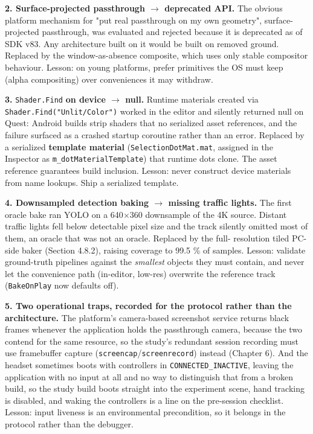 \textbf{2. Surface-projected passthrough $\rightarrow$ deprecated API.} The obvious platform mechanism for "put real
passthrough on my own geometry", surface-projected passthrough, was evaluated and rejected because
it is deprecated as of SDK v83. Any architecture built on it would be built on removed ground.
Replaced by the window-as-absence composite, which uses only stable compositor behaviour. Lesson: on
young platforms, prefer primitives the OS must keep (alpha compositing) over conveniences it may
withdraw.

\textbf{3. }\verb|Shader.Find|\textbf{ on device $\rightarrow$ null.} Runtime materials created via \verb|Shader.Find("Unlit/Color")|
worked in the editor and silently returned null on Quest: Android builds strip shaders that no
serialized asset references, and the failure surfaced as a crashed startup coroutine rather than an
error. Replaced by a serialized \textbf{template material} (\verb|SelectionDotMat.mat|, assigned in the
Inspector as \verb|m_dotMaterialTemplate|) that runtime dots clone. The asset reference guarantees build
inclusion. Lesson: never construct device materials from name lookups. Ship a serialized template.

\textbf{4. Downsampled detection baking $\rightarrow$ missing traffic lights.} The first oracle bake ran YOLO on a
640$\times$360 downsample of the 4K source. Distant traffic lights fell below detectable pixel size and the
track silently omitted most of them, an oracle that was not an oracle. Replaced by the full-
resolution tiled PC-side baker (Section 4.8.2), raising coverage to 99.5 \% of samples. Lesson:
validate ground-truth pipelines against the \textit{smallest} objects they must contain, and never let the
convenience path (in-editor, low-res) overwrite the reference track (\verb|BakeOnPlay| now defaults off).

\textbf{5. Two operational traps, recorded for the protocol rather than the architecture.} The platform's camera-based screenshot service returns black frames whenever the application holds the passthrough camera, because the two contend for the same resource, so the study's redundant session recording must use framebuffer capture (\verb|screencap|/\verb|screenrecord|) instead (Chapter 6). And the headset sometimes boots with controllers in \verb|CONNECTED_INACTIVE|, leaving the application with no input at all and no way to distinguish that from a broken build, so the study build boots straight into the experiment scene, hand tracking is disabled, and waking the controllers is a line on the pre-session checklist. Lesson: input liveness is an environmental precondition, so it belongs in the protocol rather than the debugger.

